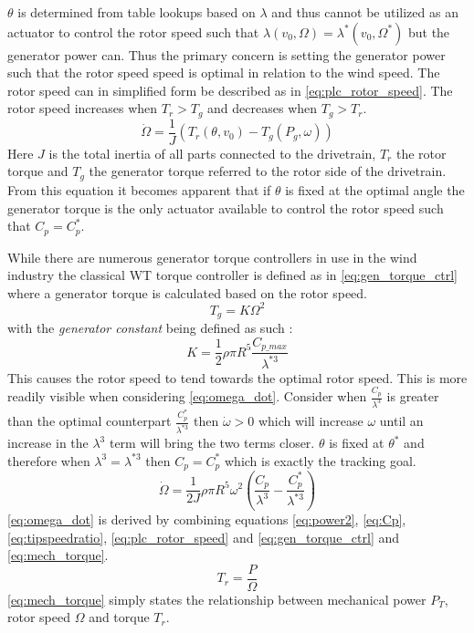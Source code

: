 $ \theta $ is determined from table lookups based on $ \lambda $ and thus cannot be utilized as an actuator to control the rotor speed such that $ \lambda(v_0, \Omega) = \lambda^*(v_0, \Omega^*) $ but the generator power can. Thus the primary concern is setting the generator power such that the rotor speed speed is optimal in relation to the wind speed. The rotor speed can in simplified form be described as in \cref{eq:plc_rotor_speed}. The rotor speed increases when $ T_r > T_g $ and decreases when $ T_g > T_r $.
\begin{equation}\label{eq:plc_rotor_speed}
	\dot{\Omega} = \dfrac{1}{J} \left( T_r(\theta, v_0) - T_g(P_g, \omega) \right)
\end{equation}
Here $ J $ is the total inertia of all parts connected to the drivetrain, $ T_r $ the rotor torque and $ T_g $ the generator torque referred to the rotor side of the drivetrain. From this equation it becomes apparent that if $ \theta $ is fixed at the optimal angle the generator torque is the only actuator available to control the rotor speed such that $ C_p = C_p^* $.

While there are numerous generator torque controllers in use in the wind industry the classical WT torque controller is defined as in \cref{eq:gen_torque_ctrl} where a generator torque is calculated based on the rotor speed.
\begin{equation}\label{eq:gen_torque_ctrl}
	T_g = K \Omega^2
\end{equation}
with the \textit{generator constant} being defined as such \cite{Pao2009}:
\begin{equation}\label{eq:gen_torque_const}
	K = \dfrac{1}{2} \rho \pi R^5 \dfrac{C_{p\_max}}{\lambda^{*3}}
\end{equation}
This causes the rotor speed to tend towards the optimal rotor speed. This is more readily visible when considering \cref{eq:omega_dot}. Consider when $ \frac{C_p}{\lambda^3} $ is greater than the optimal counterpart $ \frac{C_p^*}{\lambda^{*3}} $ then $ \dot{\omega} > 0 $ which will increase $ \omega $ until an increase in the $ \lambda^3 $ term will bring the two terms closer. $ \theta $ is fixed at $ \theta^* $ and therefore when $ \lambda^3 = \lambda^{*3} $ then $ C_p = C_p^* $ which is exactly the tracking goal.
\begin{equation}\label{eq:omega_dot}
	\dot{\Omega} = \dfrac{1}{2 J} \rho \pi R^5 \omega^2 \left( \dfrac{C_p}{\lambda^3} - \dfrac{C_p^*}{\lambda^{*3}} \right)
\end{equation}
\cref{eq:omega_dot} is derived by combining equations \cref{eq:power2}, \cref{eq:Cp}, \cref{eq:tipspeedratio}, \cref{eq:plc_rotor_speed} and \cref{eq:gen_torque_ctrl} and \cref{eq:mech_torque}.
\begin{equation}\label{eq:mech_torque}
	T_r = \dfrac{P}{\Omega}
\end{equation}
\cref{eq:mech_torque} simply states the relationship between mechanical power $ P_T $, rotor speed $ \Omega $ and torque $ T_r $.

